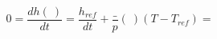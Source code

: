 \begin{equation}
0= \frac{dh(\ )}{dt} = \frac{h_{ref}}{dt}+ \frac_p(\ ) (T- T_{ref}) = 
\end{equation}